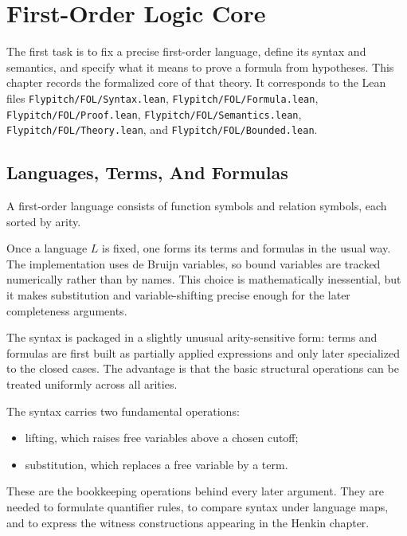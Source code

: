 \chapter{First-Order Logic Core}
\label{chap:fol-core}

The first task is to fix a precise first-order language, define its syntax and
semantics, and specify what it means to prove a formula from hypotheses. This
chapter records the formalized core of that theory. It corresponds to the Lean
files
\texttt{Flypitch/FOL/Syntax.lean},
\texttt{Flypitch/FOL/Formula.lean},
\texttt{Flypitch/FOL/Proof.lean},
\texttt{Flypitch/FOL/Semantics.lean},
\texttt{Flypitch/FOL/Theory.lean}, and
\texttt{Flypitch/FOL/Bounded.lean}.

\section{Languages, Terms, And Formulas}

\begin{definition}
\label{def:fol-language}
A first-order language consists of function symbols and relation symbols, each
sorted by arity.
\end{definition}

Once a language $L$ is fixed, one forms its terms and formulas in the usual
way. The implementation uses de Bruijn variables, so bound variables are
tracked numerically rather than by names. This choice is mathematically
inessential, but it makes substitution and variable-shifting precise enough for
the later completeness arguments.

The syntax is packaged in a slightly unusual arity-sensitive form: terms and
formulas are first built as partially applied expressions and only later
specialized to the closed cases. The advantage is that the basic structural
operations can be treated uniformly across all arities.

\begin{definition}
\label{def:fol-structural-ops}
The syntax carries two fundamental operations:
\begin{itemize}
\item lifting, which raises free variables above a chosen cutoff;
\item substitution, which replaces a free variable by a term.
\end{itemize}
\end{definition}

These are the bookkeeping operations behind every later argument. They are
needed to formulate quantifier rules, to compare syntax under language maps, and
to express the witness constructions appearing in the Henkin chapter.

